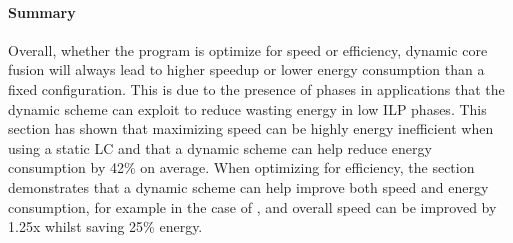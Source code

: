 \paragraph{Summary}

Overall, whether the program is optimize for speed or efficiency, dynamic core fusion will always lead to higher speedup or lower energy consumption than a fixed configuration.
This is due to the presence of phases in applications that the dynamic scheme can exploit to reduce wasting energy in low ILP phases.
This section has shown that maximizing speed can be highly energy inefficient when using a static LC and that a dynamic scheme can help reduce energy consumption by 42\% on average.
When optimizing for efficiency, the section demonstrates that a dynamic scheme can help improve both speed and energy consumption, for example in the case of , and overall speed can be improved by 1.25x whilst saving 25\% energy.

